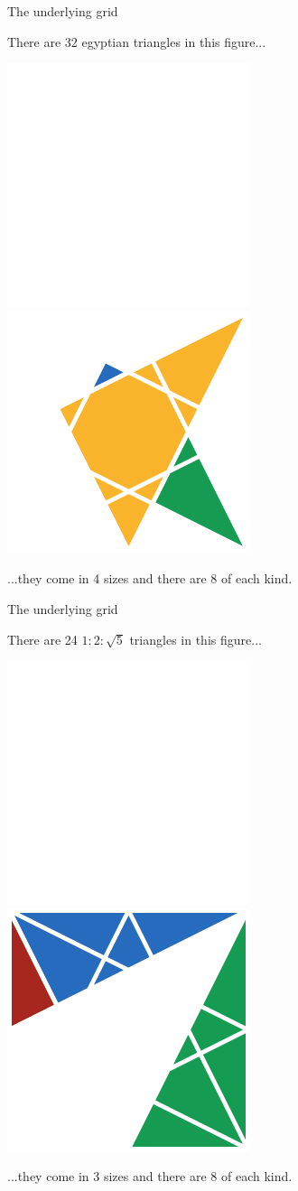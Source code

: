 \documentclass[14pt]{beamer}
\begin{document}

    \begin{frame}{The underlying grid}
        \begin{center}
            There are 32 egyptian triangles in this figure...

            \bigskip \bigskip

            \includegraphics[height=18ex]{figures/figure002b.pdf}\qquad
            \includegraphics[height=18ex]{figures/figure002c.pdf}\\

            \bigskip \bigskip

            ...they come in 4 sizes and there are 8 of each kind.
        \end{center}
    \end{frame}


    \begin{frame}{The underlying grid}
        \begin{center}
            There are 24 $1\!\!:\!\!2\!\!:\!\!\sqrt{5}$ triangles in this figure...

            \bigskip \bigskip

            \includegraphics[height=18ex]{figures/figure002b.pdf}\qquad
            \includegraphics[height=18ex]{figures/figure002d.pdf}\\

            \bigskip \bigskip

            ...they come in 3 sizes and there are 8 of each kind.
        \end{center}
    \end{frame}
\end{document}
